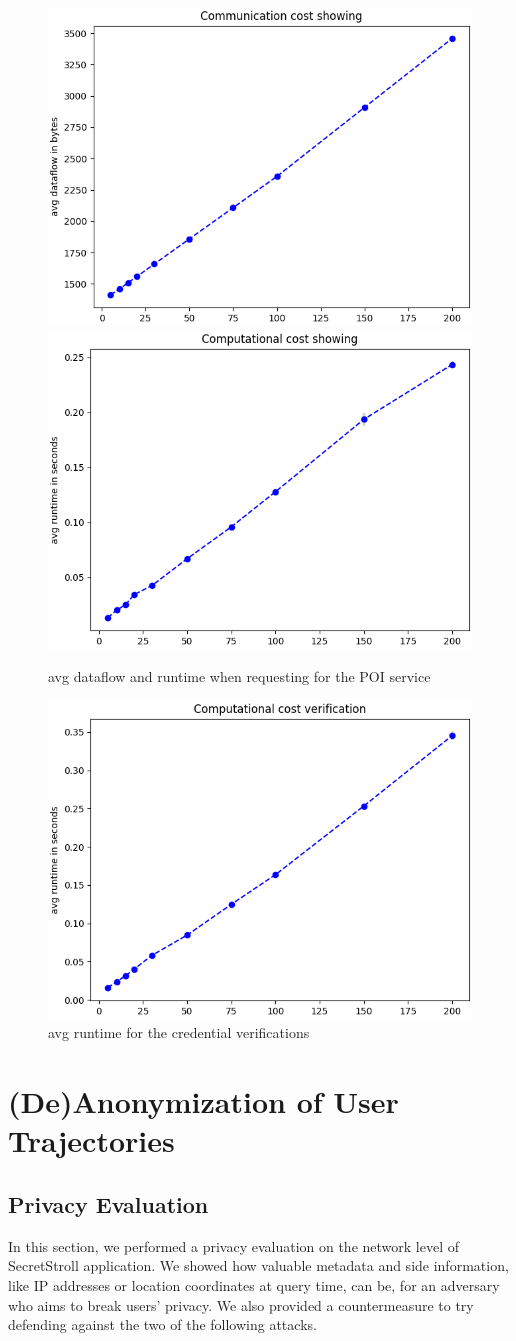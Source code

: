 \documentclass[10pt,conference,compsocconf]{IEEEtran}
\begin{document}
\begin{figure}[h!]
    \includegraphics[width=0.49\linewidth]{../performance_analysis/dataflow_showing.png}
    \includegraphics[width=0.49\linewidth]{../performance_analysis/runtime_showing.png}
    \caption{avg dataflow and runtime when requesting for the POI service}
    \label{fig:showing}
\end{figure}

\begin{figure}[h!]
    \includegraphics[width=0.49\linewidth]{../performance_analysis/runtime_verification}
    \caption{avg runtime for the credential verifications}
    \label{fig:verify}
\end{figure}


\section{(De)Anonymization of User Trajectories}

\subsection{Privacy Evaluation}
In this section, we performed a privacy evaluation on the network level of SecretStroll application. We showed how valuable metadata and side information, like IP addresses or location coordinates at query time, can be, for an adversary who aims to break users' privacy. We also provided a countermeasure to try defending against the two of the following attacks.
\end{document}
